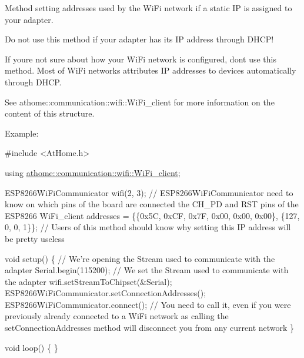 Method setting addresses used by the Wi\+Fi network if a static IP is assigned to your adapter.

Do not use this method if your adapter has its IP address through D\+H\+C\+P!

If you\textquotesingle{}re not sure about how your Wi\+Fi network is configured, don\textquotesingle{}t use this method. Most of Wi\+Fi networks attributes IP addresses to devices automatically through D\+H\+CP.

See athome\+::communication\+::wifi\+::\+Wi\+Fi\+\_\+client for more information on the content of this structure.

Example\+:


\begin{DoxyCode}
\textcolor{preprocessor}{#include <AtHome.h>}

\textcolor{keyword}{using} \mbox{\hyperlink{structathome_1_1communication_1_1wifi_1_1s__wifi__client}{athome::communication::wifi::WiFi\_client}};

ESP8266WiFiCommunicator wifi(2, 3); \textcolor{comment}{// ESP8266WiFiCommunicator need to know on which pins of the board are
       connected the CH\_PD and RST pins of the ESP8266}
WiFi\_client addresses = \{\{0x5C, 0xCF, 0x7F, 0x00, 0x00, 0x00\}, \{127, 0, 0, 1\}\}; \textcolor{comment}{// Users of this method
       should know why setting this IP address will be pretty useless}

\textcolor{keywordtype}{void} setup() \{
  \textcolor{comment}{// We're opening the Stream used to communicate with the adapter}
  Serial.begin(115200);
  \textcolor{comment}{// We set the Stream used to communicate with the adapter}
  wifi.setStreamToChipset(&Serial);
  ESP8266WiFiCommunicator.setConnectionAddresses();
  ESP8266WiFiCommunicator.connect(); \textcolor{comment}{// You need to call it, even if you were previously already connected
       to a WiFi network as calling the setConnectionAddresses method will disconnect you from any current network}
\}

\textcolor{keywordtype}{void} loop() \{
\}
\end{DoxyCode}
 \mbox{\label{classathome_1_1communication_1_1wifi_1_1_a_wi_fi_communicator_ab9d7165657cb8be4995f637a57b8f9e1}} 
